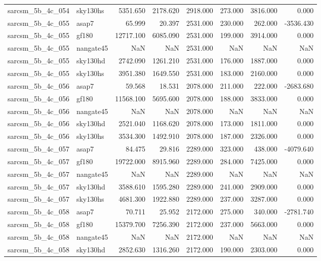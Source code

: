 \begin{tabular}{llrrrrrr}
sarcsm\_5b\_4c\_054 & sky130hs & 5351.650 & 2178.620 & 2918.000 & 273.000 & 3816.000 & 0.000 \\
sarcsm\_5b\_4c\_055 & asap7 & 65.999 & 20.397 & 2531.000 & 230.000 & 262.000 & -3536.430 \\
sarcsm\_5b\_4c\_055 & gf180 & 12717.100 & 6085.090 & 2531.000 & 199.000 & 3914.000 & 0.000 \\
sarcsm\_5b\_4c\_055 & nangate45 & NaN & NaN & 2531.000 & NaN & NaN & NaN \\
sarcsm\_5b\_4c\_055 & sky130hd & 2742.090 & 1261.210 & 2531.000 & 176.000 & 1887.000 & 0.000 \\
sarcsm\_5b\_4c\_055 & sky130hs & 3951.380 & 1649.550 & 2531.000 & 183.000 & 2160.000 & 0.000 \\
sarcsm\_5b\_4c\_056 & asap7 & 59.568 & 18.531 & 2078.000 & 211.000 & 222.000 & -2683.680 \\
sarcsm\_5b\_4c\_056 & gf180 & 11568.100 & 5695.600 & 2078.000 & 188.000 & 3833.000 & 0.000 \\
sarcsm\_5b\_4c\_056 & nangate45 & NaN & NaN & 2078.000 & NaN & NaN & NaN \\
sarcsm\_5b\_4c\_056 & sky130hd & 2521.040 & 1168.620 & 2078.000 & 173.000 & 1811.000 & 0.000 \\
sarcsm\_5b\_4c\_056 & sky130hs & 3534.300 & 1492.910 & 2078.000 & 187.000 & 2326.000 & 0.000 \\
sarcsm\_5b\_4c\_057 & asap7 & 84.475 & 29.816 & 2289.000 & 323.000 & 438.000 & -4079.640 \\
sarcsm\_5b\_4c\_057 & gf180 & 19722.000 & 8915.960 & 2289.000 & 284.000 & 7425.000 & 0.000 \\
sarcsm\_5b\_4c\_057 & nangate45 & NaN & NaN & 2289.000 & NaN & NaN & NaN \\
sarcsm\_5b\_4c\_057 & sky130hd & 3588.610 & 1595.280 & 2289.000 & 241.000 & 2909.000 & 0.000 \\
sarcsm\_5b\_4c\_057 & sky130hs & 4681.300 & 1922.880 & 2289.000 & 237.000 & 3287.000 & 0.000 \\
sarcsm\_5b\_4c\_058 & asap7 & 70.711 & 25.952 & 2172.000 & 275.000 & 340.000 & -2781.740 \\
sarcsm\_5b\_4c\_058 & gf180 & 15379.700 & 7256.390 & 2172.000 & 237.000 & 5663.000 & 0.000 \\
sarcsm\_5b\_4c\_058 & nangate45 & NaN & NaN & 2172.000 & NaN & NaN & NaN \\
sarcsm\_5b\_4c\_058 & sky130hd & 2852.630 & 1316.260 & 2172.000 & 190.000 & 2303.000 & 0.000 \\

\end{tabular}
